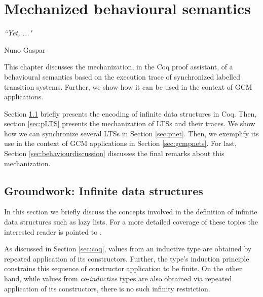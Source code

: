
\chapter{Mechanized behavioural semantics} 
\label{chap:behaviour} 

\epigraph{\textit{“Yet, ..."}}{Nuno Gaspar}



\minitoc




	This chapter discusses the mechanization, in the Coq proof assistant, of a behavioural 
semantics based on the execution trace of synchronized labelled transition systems. Further, we show
how it can be used in the context of \ac{GCM} applications.

	Section \ref{sec:groundwork} briefly presents the encoding of infinite data structures in Coq.	
	Then, section \ref{sec:pLTS} presents the mechanization of \ac{LTS}s and
their traces. We show how we can synchronize several \ac{LTS}s in Section \ref{sec:pnet}.
Then, we exemplify its use in the context of \ac{GCM} applications in Section \ref{sec:gcmpnets}.
For last, Section \ref{sec:behaviourdiscussion} discusses the final remarks about this
mechanization.



\section{Groundwork: Infinite data structures}
\label{sec:groundwork}

	In this section we briefly discuss the concepts involved in the definition of infinite data structures such as lazy lists.	
	For a more detailed coverage of these topics the interested
	reader is pointed to \cite[chap. 13]{opac-b1101046}.


	As discussed in Section \ref{sec:coq}, values from an inductive type are obtained by repeated application of
	its constructors. Further, the type's induction principle constrains this sequence of constructor application
	to be finite. On the other hand, while values from \textit{co-inductive} types are also obtained via repeated 
	application of its constructors, there is no such infinity restriction.

